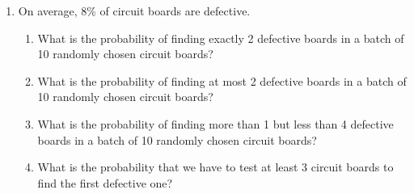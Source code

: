 \begin{enumerate}
\item On average, 8\% of circuit boards are defective.
  \begin{enumerate}
    \item What is the probability of finding exactly 2 defective boards in a batch of
  10 randomly chosen circuit boards?
    \item What is the probability of finding at most 2 defective boards in a batch of
  10 randomly chosen circuit boards?
    \item What is the probability of finding more than 1 but less than 4 defective
      boards in a batch of
  10 randomly chosen circuit boards?
    \item What is the probability that we have to test at least 3 circuit boards to find the first defective one?
    \end{enumerate}


\end{enumerate}
